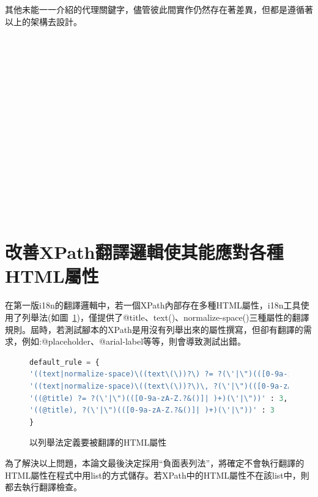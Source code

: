 其他未能一一介紹的代理關鍵字，儘管彼此間實作仍然存在著差異，但都是遵循著以上的架構去設計。


\hspace*{\fill} \\
\\ \hspace*{\fill} \\
\\ \hspace*{\fill} \\
\\ \hspace*{\fill} \\
\\ \hspace*{\fill} \\
\\ \hspace*{\fill} \\
\\ \hspace*{\fill} \\
\\ \hspace*{\fill} \\
\section{改善XPath翻譯邏輯使其能應對各種HTML屬性}
在第一版i18n的翻譯邏輯中，若一個XPath內部存在多種HTML屬性，i18n工具使用了列舉法(如圖~\ref{以列舉法定義要被翻譯的HTML屬性})，僅提供了@title、text()、normalize-space()三種屬性的翻譯規則。屆時，若測試腳本的XPath是用沒有列舉出來的屬性撰寫，但卻有翻譯的需求，例如:@placeholder、@arial-label等等，則會導致測試出錯。

\begin{figure}[H]
\begin{lstlisting}[language={python}]
default_rule = {
'((text|normalize-space)\((text\(\))?\) ?= ?(\'|\")(([0-9a-zA-Z.?&()]| )+)(\'|\"))': 4,
'((text|normalize-space)\((text\(\))?\)\, ?(\'|\")(([0-9a-zA-Z.?&()]| )+)(\'|\"))': 4,
'((@title) ?= ?(\'|\")(([0-9a-zA-Z.?&()]| )+)(\'|\"))' : 3,
'((@title), ?(\'|\")(([0-9a-zA-Z.?&()]| )+)(\'|\"))' : 3
}
\end{lstlisting}
\caption{以列舉法定義要被翻譯的HTML屬性}
\label{以列舉法定義要被翻譯的HTML屬性}
\end{figure}

為了解決以上問題，本論文最後決定採用“負面表列法”，將確定不會執行翻譯的HTML屬性在程式中用list的方式儲存。若XPath中的HTML屬性不在該list中，則都去執行翻譯檢查。

